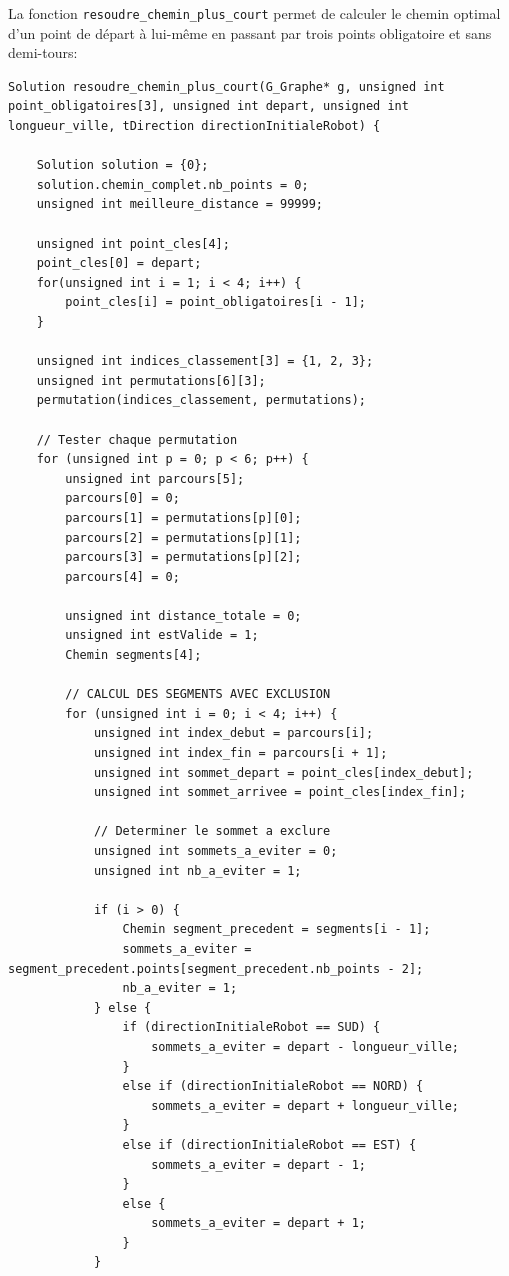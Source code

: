 \documentclass[11pt,a4paper]{article}
\begin{document}
La fonction \texttt{resoudre\_chemin\_plus\_court} permet de calculer le chemin optimal d'un point de départ à lui-même en passant par trois points obligatoire et sans demi-tours:

\begin{lstlisting}[caption={Fonction de résolution du chemin optimal}, label=lst:resoudre]
Solution resoudre_chemin_plus_court(G_Graphe* g, unsigned int point_obligatoires[3], unsigned int depart, unsigned int longueur_ville, tDirection directionInitialeRobot) {

    Solution solution = {0};
    solution.chemin_complet.nb_points = 0;
    unsigned int meilleure_distance = 99999;

    unsigned int point_cles[4];
    point_cles[0] = depart;
    for(unsigned int i = 1; i < 4; i++) {
        point_cles[i] = point_obligatoires[i - 1];
    }

    unsigned int indices_classement[3] = {1, 2, 3};
    unsigned int permutations[6][3];
    permutation(indices_classement, permutations);

    // Tester chaque permutation
    for (unsigned int p = 0; p < 6; p++) {        
        unsigned int parcours[5];
        parcours[0] = 0;
        parcours[1] = permutations[p][0];
        parcours[2] = permutations[p][1];
        parcours[3] = permutations[p][2];
        parcours[4] = 0;

        unsigned int distance_totale = 0;
        unsigned int estValide = 1;
        Chemin segments[4];

        // CALCUL DES SEGMENTS AVEC EXCLUSION
        for (unsigned int i = 0; i < 4; i++) {
            unsigned int index_debut = parcours[i];
            unsigned int index_fin = parcours[i + 1];
            unsigned int sommet_depart = point_cles[index_debut];
            unsigned int sommet_arrivee = point_cles[index_fin];

            // Determiner le sommet a exclure
            unsigned int sommets_a_eviter = 0;
            unsigned int nb_a_eviter = 1;

            if (i > 0) {
                Chemin segment_precedent = segments[i - 1];
                sommets_a_eviter = segment_precedent.points[segment_precedent.nb_points - 2];
                nb_a_eviter = 1;
            } else {
                if (directionInitialeRobot == SUD) {
                    sommets_a_eviter = depart - longueur_ville;
                }
                else if (directionInitialeRobot == NORD) {
                    sommets_a_eviter = depart + longueur_ville;
                }
                else if (directionInitialeRobot == EST) {
                    sommets_a_eviter = depart - 1;
                }
                else {
                    sommets_a_eviter = depart + 1;
                }
            }


\end{lstlisting}
\end{document}
